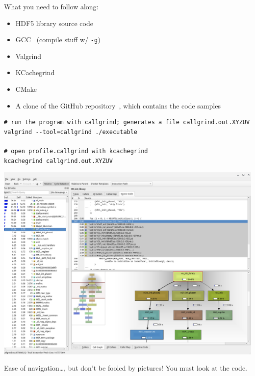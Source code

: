 What you need to follow along:

\begin{itemize}
    \item HDF5 library source code~\cite{libhdf52023}
    \item GCC~\cite{gcc2023} (compile stuff w/ \texttt{-g})
    \item Valgrind~\cite{valgrind2023}
    \item KCachegrind~\cite{kcachegrind2023}
    \item CMake~\cite{cmake2023}
    \item A clone of the GitHub repository~\cite{hdf5-tourist}, which contains the code samples
\end{itemize}

\begin{verbatim}
# run the program with callgrind; generates a file callgrind.out.XYZUV
valgrind --tool=callgrind ./executable

# open profile.callgrind with kcachegrind
kcachegrind callgrind.out.XYZUV
\end{verbatim}

\includegraphics[scale=0.3]{images/kcachegrind.png}

Ease of navigation\ldots, but don't be fooled by pictures! You must look at the code.

